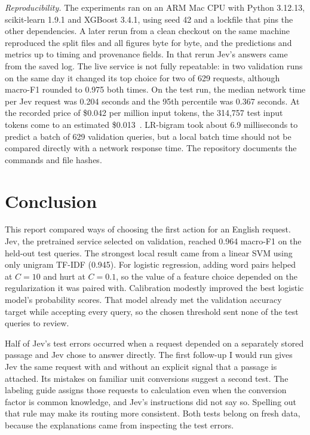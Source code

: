 \documentclass[conference]{IEEEtran}
\begin{document}
\emph{Reproducibility.} The experiments ran on an ARM Mac CPU with Python 3.12.13, scikit-learn 1.9.1 and XGBoost 3.4.1, using seed 42 and a lockfile that pins the other dependencies. A later rerun from a clean checkout on the same machine reproduced the split files and all figures byte for byte, and the predictions and metrics up to timing and provenance fields. In that rerun Jev's answers came from the saved log. The live service is not fully repeatable: in two validation runs on the same day it changed its top choice for two of 629 requests, although macro-F1 rounded to 0.975 both times. On the test run, the median network time per Jev request was 0.204 seconds and the 95th percentile was 0.367 seconds. At the recorded price of \$0.042 per million input tokens, the 314,757 test input tokens come to an estimated \$0.013~\cite{jev}. LR-bigram took about 6.9 milliseconds to predict a batch of 629 validation queries, but a local batch time should not be compared directly with a network response time. The repository documents the commands and file hashes.

\section{Conclusion}
This report compared ways of choosing the first action for an English request. Jev, the pretrained service selected on validation, reached 0.964 macro-F1 on the held-out test queries. The strongest local result came from a linear SVM using only unigram TF-IDF (0.945). For logistic regression, adding word pairs helped at \(C=10\) and hurt at \(C=0.1\), so the value of a feature choice depended on the regularization it was paired with. Calibration modestly improved the best logistic model's probability scores. That model already met the validation accuracy target while accepting every query, so the chosen threshold sent none of the test queries to review.

Half of Jev's test errors occurred when a request depended on a separately stored passage and Jev chose to answer directly. The first follow-up I would run gives Jev the same request with and without an explicit signal that a passage is attached. Its mistakes on familiar unit conversions suggest a second test. The labeling guide assigns those requests to calculation even when the conversion factor is common knowledge, and Jev's instructions did not say so. Spelling out that rule may make its routing more consistent. Both tests belong on fresh data, because the explanations came from inspecting the test errors.
\end{document}
